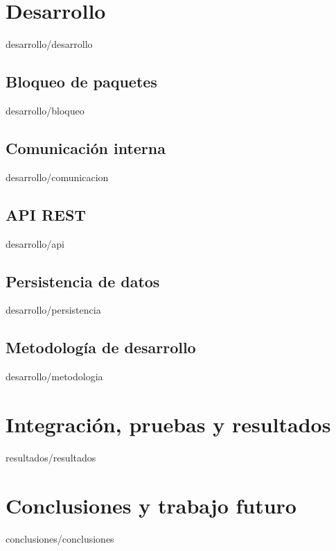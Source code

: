\documentclass[epsbased,copyright,final,printable,covers,extendedindex,firstnumbered,tfg,gnuplot]{tfgtfmthesisuam}
\begin{document}
    
    
    
\chapter{Desarrollo\label{CAP:DESARROLLO}}{desarrollo/desarrollo}
    \section{Bloqueo de paquetes\label{SEC:DSRBLOQUEO}}{desarrollo/bloqueo}
    \section{Comunicación interna\label{SEC:DSRCOMUNICACION}}{desarrollo/comunicacion}
        \section{API REST\label{SEC:DSRAPI}}{desarrollo/api}
    \section{Persistencia de datos\label{SEC:DSRPERSISTENCIA}}{desarrollo/persistencia}
    \section{Metodología de desarrollo\label{SEC:DSRMETODOLOGIA}}{desarrollo/metodologia}


    


\chapter{Integración, pruebas y resultados\label{CAP:RESULTADOS}}{resultados/resultados}


\chapter{Conclusiones y trabajo futuro\label{CAP:CONCLUSIONES}}{conclusiones/conclusiones}



\newpage
{}



\end{document}
